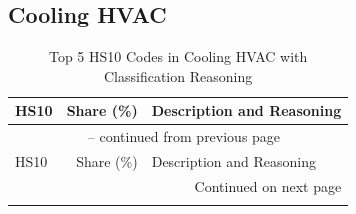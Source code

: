 \clearpage

\subsection{Cooling HVAC}

\begin{longtable}{lrp{12cm}}
\caption{Top 5 HS10 Codes in Cooling HVAC with Classification Reasoning}\\
\toprule
HS10 & Share (\%) & Description and Reasoning \\
\midrule
\endfirsthead

\multicolumn{3}{c}{{\tablename\ \thetable{} -- continued from previous page}} \\
\toprule
HS10 & Share (\%) & Description and Reasoning \\
\midrule
\endhead

\midrule
\multicolumn{3}{r}{{Continued on next page}} \\
\endfoot

\bottomrule
\endlastfoot


\end{longtable}
